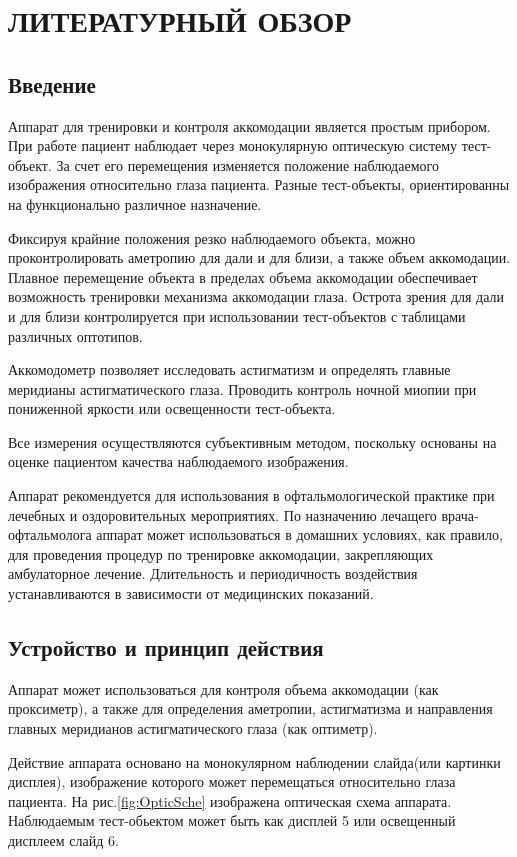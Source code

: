 \chapter{ЛИТЕРАТУРНЫЙ ОБЗОР}
\section{Введение}
Аппарат для тренировки и контроля аккомодации является простым прибором. При работе пациент наблюдает через монокулярную оптическую систему тест-объект. За счет его перемещения изменяется положение наблюдаемого изображения относительно глаза пациента. Разные тест-объекты, ориентированны на функционально различное назначение. 

Фиксируя крайние положения резко наблюдаемого объекта, можно проконтролировать аметропию  для дали и для близи, а также объем аккомодации. Плавное перемещение объекта в пределах объема аккомодации обеспечивает возможность тренировки механизма аккомодации глаза. Острота зрения для дали и для близи контролируется при использовании тест-объектов с таблицами различных оптотипов.

Аккомодометр позволяет исследовать астигматизм и определять главные меридианы астигматического глаза. Проводить контроль ночной миопии при пониженной яркости или освещенности тест-объекта. 

Все измерения осуществляются субъективным методом, поскольку основаны на оценке пациентом качества наблюдаемого изображения.

Аппарат рекомендуется для использования в офтальмологической практике при лечебных и оздоровительных мероприятиях. По назначению лечащего врача-офтальмолога аппарат может использоваться в домашних условиях, как правило, для проведения процедур по тренировке аккомодации, закрепляющих амбулаторное лечение. Длительность и периодичность воздействия устанавливаются в зависимости от медицинских показаний.

\section{Устройство и принцип действия}
Аппарат может использоваться для контроля объема аккомодации (как проксиметр), а также для определения аметропии, астигматизма и направления главных меридианов астигматического глаза (как оптиметр). 

Действие аппарата основано на монокулярном наблюдении слайда(или картинки дисплея), изображение которого может перемещаться относительно глаза пациента. На рис.\ref{fig:OpticSche} изображена оптическая схема аппарата. Наблюдаемым тест-обьектом может быть как дисплей 5 или освещенный дисплеем слайд 6.

